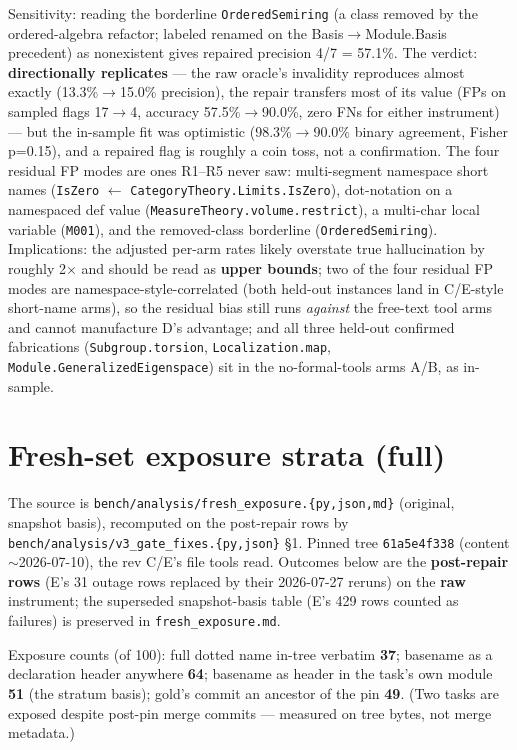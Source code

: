 \documentclass[10pt]{article}
\newcommand{\code}[1]{\texttt{#1}}
\begin{document}
Sensitivity: reading the borderline \code{OrderedSemiring} (a class
removed by the ordered-algebra refactor; labeled renamed on the
Basis$\to$Module.Basis precedent) as nonexistent gives repaired
precision 4/7 = 57.1\%. The verdict: \textbf{directionally
replicates} --- the raw oracle's invalidity reproduces almost exactly
(13.3\%$\to$15.0\% precision), the repair transfers most of its value
(FPs on sampled flags 17$\to$4, accuracy 57.5\%$\to$90.0\%, zero FNs
for either instrument) --- but the in-sample fit was optimistic
(98.3\%$\to$90.0\% binary agreement, Fisher p=0.15), and a repaired
flag is roughly a coin toss, not a confirmation. The four residual FP
modes are ones R1--R5 never saw: multi-segment namespace short names
(\code{IsZero} $\leftarrow$ \code{CategoryTheory.Limits.IsZero}),
dot-notation on a namespaced def value
(\code{MeasureTheory.volume.restrict}), a multi-char local variable
(\code{M001}), and the removed-class borderline
(\code{OrderedSemiring}). Implications: the adjusted per-arm rates
likely overstate true hallucination by roughly 2$\times$ and should be
read as \textbf{upper bounds}; two of the four residual FP modes are
namespace-style-correlated (both held-out instances land in C/E-style
short-name arms), so the residual bias still runs \emph{against} the
free-text tool arms and cannot manufacture D's advantage; and all three
held-out confirmed fabrications (\code{Subgroup.torsion},
\code{Localization.map}, \code{Module.GeneralizedEigenspace}) sit in
the no-formal-tools arms A/B, as in-sample.

\section{Fresh-set exposure strata (full)}\label{s4}

The source is \code{bench/analysis/fresh\_exposure.\{py,json,md\}}
(original, snapshot basis), recomputed on the post-repair rows by
\code{bench/analysis/v3\_gate\_fixes.\{py,json\}} \S 1. Pinned tree
\code{61a5e4f338} (content $\sim$2026-07-10), the rev C/E's file tools
read. Outcomes below are the \textbf{post-repair rows} (E's 31 outage
rows replaced by their 2026-07-27 reruns) on the \textbf{raw}
instrument; the superseded snapshot-basis table (E's 429 rows counted
as failures) is preserved in \code{fresh\_exposure.md}.

Exposure counts (of 100): full dotted name in-tree verbatim
\textbf{37}; basename as a declaration header anywhere \textbf{64};
basename as header in the task's own module \textbf{51} (the stratum
basis); gold's commit an ancestor of the pin \textbf{49}. (Two tasks
are exposed despite post-pin merge commits --- measured on tree bytes,
not merge metadata.)
\end{document}
